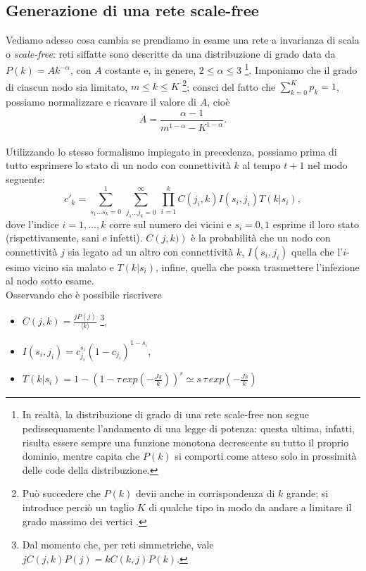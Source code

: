 \subsection{Generazione di una rete scale-free}
Vediamo adesso cosa cambia se prendiamo in esame una rete a invarianza di scala o \emph{scale-free}: reti siffatte sono descritte da una distribuzione di grado data da $ P\left(k\right) = A k^{-\alpha} $, con $ A $ costante e, in genere, $ 2 \leq \alpha \leq 3 $ \footnote{In realtà, la distribuzione di grado di una rete scale-free non segue pedissequamente l'andamento di una legge di potenza: questa ultima, infatti, risulta essere sempre una funzione monotona decrescente su tutto il proprio dominio, mentre capita che $ P\left(k\right) $ si comporti come atteso solo in prossimità delle code della distribuzione.}. 
Imponiamo che il grado di ciascun nodo sia limitato, $ m \leq k \leq K $ \footnote{Può succedere che $ P\left(k\right)$ devii anche in corrispondenza di $ k $ grande; si introduce perciò un taglio $ K $ di qualche tipo in modo da andare a limitare il grado massimo dei vertici \cite{Newman}.}; 
consci del fatto che $ \sum_{k = 0}^K p_k = 1 $, possiamo normalizzare e ricavare il valore di $ A $, cioè 
\[
 A = \frac{ \alpha - 1}{m^{1 - \alpha} - K^{1 - \alpha}}.
\]
 \\ Utilizzando lo stesso formalismo impiegato in precedenza, possiamo prima di tutto esprimere lo stato di un nodo con connettività $ k $ al tempo $ t + 1 $ nel modo seguente:
\begin{equation}
	c'_k = \sum_{s_1 \dots s_k = 0}^1 \, \sum_{j_1 \dots j_k = 0}^ \infty \, \prod_{i = 1}^k C\left(j_i,k\right) I\left(s_i, j_i\right) T\left(k|s_i\right),
\end{equation}
dove l'indice $ i = 1, \dots, k $ corre sul numero dei vicini e $ s_i = 0, 1 $ esprime il loro stato (rispettivamente, sani e infetti). $ C\left(j,k)\right) $ è la probabilità che un nodo con connettività $ j $ sia legato ad un altro con connettività $ k $, $ I\left(s_i, j_i\right) $ quella che l'$ i $-esimo vicino sia malato e $ T\left(k|s_i\right) $, infine, quella che possa trasmettere l'infezione al nodo sotto esame. \\ Osservando che è possibile riscrivere
\begin{itemize}
	\item $ C\left(j,k\right) = \frac{j P\left(j\right)}{\langle k \rangle} $ \footnote{Dal momento che, per reti simmetriche, vale $ j C\left(j,k\right) P\left(j\right) = k C\left(k,j\right) P\left(k\right) $.},
	\item $ I\left(s_i, j_i\right) = c_{j_i}^{s_i} \left(1 - c_{j_i}\right)^{1 - s_i} $,
	\item $ T\left(k|s_i\right) = 1 - \left(1 - \tau \, exp(- \tfrac{J s}{k})\right)^s \simeq s \, \tau \, exp(- \tfrac{J s}{k}) $ 
\end{itemize}
